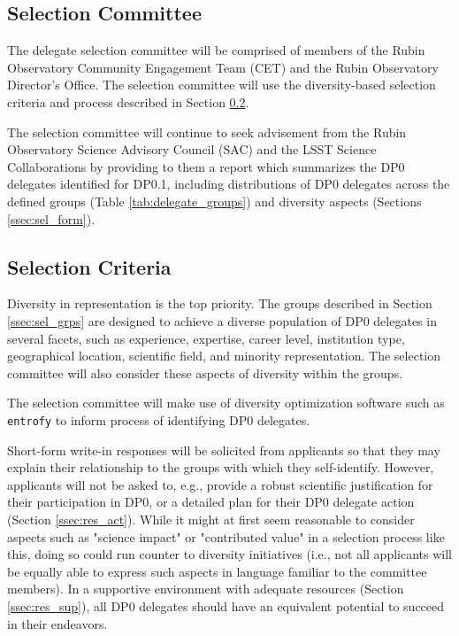 \documentclass[DM,lsstdraft,authoryear,toc]{lsstdoc}
\begin{document}
\subsection{Selection Committee}\label{ssec:sel_comm}

The delegate selection committee will be comprised of members of the Rubin Observatory Community Engagement Team (CET) and the Rubin Observatory Director's Office.
The selection committee will use the diversity-based selection criteria and process described in Section \ref{ssec:sel_crit}.

The selection committee will continue to seek advisement from the Rubin Observatory Science Advisory Council (SAC) and the LSST Science Collaborations by providing to them a report which summarizes the DP0 delegates identified for DP0.1, including distributions of DP0 delegates across the defined groups (Table \ref{tab:delegate_groups}) and diversity aspects (Sections \ref{ssec:sel_form}).

\subsection{Selection Criteria}\label{ssec:sel_crit}

Diversity in representation is the top priority.
The groups described in Section \ref{ssec:sel_grps} are designed to achieve a diverse population of DP0 delegates in several facets, such as experience, expertise, career level, institution type, geographical location, scientific field, and minority representation.
The selection committee will also consider these aspects of diversity within the groups.

The selection committee will make use of diversity optimization software such as {\tt entrofy} \citep{2019arXiv190503314H} to inform process of identifying DP0 delegates.

Short-form write-in responses will be solicited from applicants so that they may explain their relationship to the groups with which they self-identify.
However, applicants will not be asked to, e.g., provide a robust scientific justification for their participation in DP0, or a detailed plan for their DP0 delegate action (Section \ref{ssec:res_act}).
While it might at first seem reasonable to consider aspects such as "science impact" or "contributed value" in a selection process like this, doing so could run counter to diversity initiatives (i.e., not all applicants will be equally able to express such aspects in language familiar to the committee members).
In a supportive environment with adequate resources (Section \ref{ssec:res_sup}), all DP0 delegates should have an equivalent potential to succeed in their endeavors.
\end{document}
